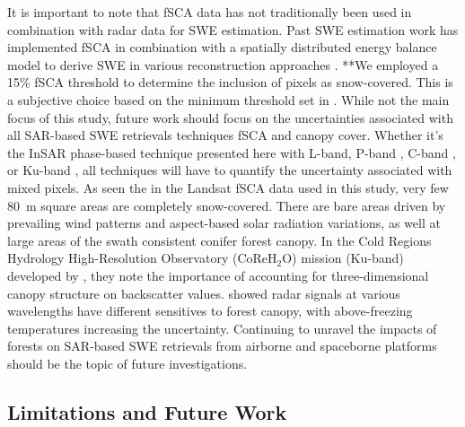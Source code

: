 It is important to note that fSCA data has not traditionally been used in combination with radar data for SWE estimation. Past SWE estimation work has implemented fSCA in combination with a spatially distributed energy balance model to derive SWE in various reconstruction approaches \citep{clineEstimatingSpatialDistribution1998,molotchEstimatingDistributionSnow2008,rittgerSpatialEstimatesSnow2016,margulisLandsatEraSierraNevada2016}. **We employed a 15\% fSCA threshold to determine the inclusion of pixels as snow-covered. This is a subjective choice based on the minimum threshold set in \cite{painterRetrievalSubpixelSnow2009}. While not the main focus of this study, future work should focus on the uncertainties associated with all SAR-based SWE retrievals techniques fSCA and canopy cover. Whether it's the InSAR phase-based technique presented here with L-band, P-band \citep{shahRemoteSensingSnow2017,maEstimatingSpatiotemporallyContinuous2023}, C-band \citep{lievensSnowDepthVariability2019,oveisgharanSnowWaterEquivalent2023}, or Ku-band \citep{tsangReviewArticleGlobal2022,rottColdRegionsHydrology2010}, all techniques will have to quantify the uncertainty associated with mixed pixels. As seen the in the Landsat fSCA data used in this study, very few 80~m square areas are completely snow-covered. There are bare areas driven by prevailing wind patterns and aspect-based solar radiation variations, as well at large areas of the swath consistent conifer forest canopy. In the Cold Regions Hydrology High-Resolution Observatory (CoReH$_{2}$O) mission (Ku-band) developed by \cite{rottColdRegionsHydrology2010}, they note the importance of accounting for three-dimensional canopy structure on backscatter values. \cite{lemmetyinenAttenuationRadarSignal2022} showed radar signals at various wavelengths have different sensitives to forest canopy, with above-freezing temperatures increasing the uncertainty. Continuing to unravel the impacts of forests on SAR-based SWE retrievals from airborne and spaceborne platforms should be the topic of future investigations.


\hypertarget{ch5-discussion-2}{\subsection{Limitations and Future Work}\label{ch4-discussion-2}}

